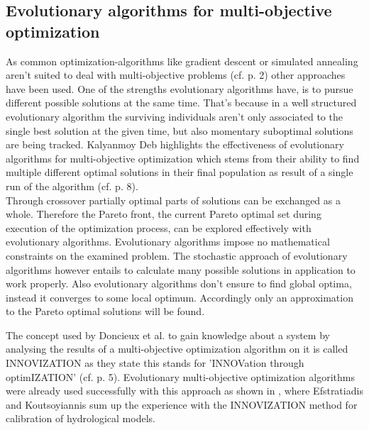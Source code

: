 \documentclass[12pt,twoside]{article}
\theoremstyle{plain}
\theoremstyle{definition}
\theoremstyle{remark}
\begin{document}
\subsection{Evolutionary algorithms for multi-objective optimization}
\label{back:evo_in_multi-opt}
As common optimization-algorithms like gradient descent or simulated annealing aren't suited to deal with multi-objective problems (cf. \cite{fonseca1995overview} p. 2) other approaches have been used.
One of the strengths evolutionary algorithms have, is to pursue different possible solutions at the same time. That's because in a well structured evolutionary algorithm the surviving individuals aren't only associated to the single best solution at the given time, but also momentary suboptimal solutions are being tracked. 
Kalyanmoy Deb highlights the effectiveness of evolutionary algorithms for multi-objective optimization which stems from their ability to find multiple different optimal solutions in their final population as result of a single run of the algorithm (cf. \cite{deb2001multi} p. 8).\\
Through crossover partially optimal parts of solutions can be exchanged as a whole. 
Therefore the Pareto front, the current Pareto optimal set during execution of the optimization process, can be explored effectively with evolutionary algorithms.
Evolutionary algorithms impose no mathematical constraints on the examined problem. The stochastic approach of evolutionary algorithms however entails to calculate many possible solutions in application to work properly. Also evolutionary algorithms don't ensure to find global optima, instead it converges to some local optimum. Accordingly only an approximation to the Pareto optimal solutions will be found.

The concept used by Doncieux et al. to gain knowledge about a system by analysing the results of a multi-objective optimization algorithm on it is called INNOVIZATION as they state this stands for 'INNOVation through optimIZATION' (cf. \cite{doncieux2015multi} p. 5).
Evolutionary multi-objective optimization algorithms were already used successfully with this approach as shown in \cite{efstratiadis2010one}, where Efstratiadis and Koutsoyiannis sum up the experience with the INNOVIZATION method for calibration of hydrological models.
\end{document}
